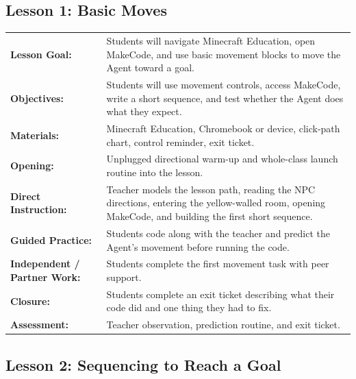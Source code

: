 \documentclass[12pt]{article}
\begin{document}
\subsection{Lesson 1: Basic Moves}

\begin{tabular}{@{}P{1.7in}P{4.3in}@{}}
\textbf{Lesson Goal:} & Students will navigate Minecraft Education, open MakeCode, and use basic movement blocks to move the Agent toward a goal. \\
\textbf{Objectives:} & Students will use movement controls, access MakeCode, write a short sequence, and test whether the Agent does what they expect. \\
\textbf{Materials:} & Minecraft Education, Chromebook or device, click-path chart, control reminder, exit ticket. \\
\textbf{Opening:} & Unplugged directional warm-up and whole-class launch routine into the lesson. \\
\textbf{Direct Instruction:} & Teacher models the lesson path, reading the NPC directions, entering the yellow-walled room, opening MakeCode, and building the first short sequence. \\
\textbf{Guided Practice:} & Students code along with the teacher and predict the Agent's movement before running the code. \\
\textbf{Independent / Partner Work:} & Students complete the first movement task with peer support. \\
\textbf{Closure:} & Students complete an exit ticket describing what their code did and one thing they had to fix. \\
\textbf{Assessment:} & Teacher observation, prediction routine, and exit ticket. \\
\end{tabular}

\subsection{Lesson 2: Sequencing to Reach a Goal}
\end{document}
